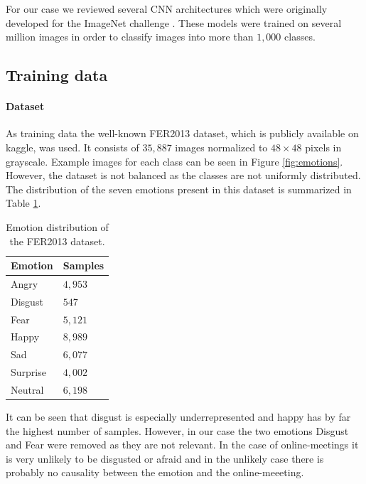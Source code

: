 \documentclass{article}
\begin{document}
For our case we reviewed several CNN architectures which were originally developed for the ImageNet challenge \cite{russakovsky2015imagenet}. These models were trained on several million images in order to classify images into more than $1,000$ classes.

\subsection{Training data}
\paragraph{Dataset} As training data the well-known FER2013 dataset, which is publicly available on kaggle, was used.  It consists of $35,887$ images normalized to $48 \times 48$ pixels in grayscale. Example images for each class can be seen in Figure \ref{fig:emotions}. However, the dataset is not balanced as the classes are not uniformly distributed. The distribution of the seven emotions present in this dataset is summarized in Table \ref{tab:fer}.

\begin{table}
  \centering
\begin{tabular}{ |p{2cm}||p{2cm}| }
 \hline
 Emotion & Samples\\
 \hline
 Angry & $4,953$\\
 \hline
 Disgust & $547$\\
 \hline
 Fear & $5,121$\\
 \hline
 Happy & $8,989$\\
 \hline
 Sad & $6,077$\\
 \hline
 Surprise & $4,002$\\
 \hline
 Neutral & $6,198$\\
 \hline
\end{tabular}
\caption{Emotion distribution of the FER2013 dataset.}
\label{tab:fer}
\end{table}

It can be seen that disgust is especially underrepresented and happy has by far the highest number of samples. However, in our case the two emotions Disgust and Fear were removed as they are not relevant. In the case of online-meetings it is very unlikely to be disgusted or afraid and in the unlikely case there is probably no causality between the emotion and the online-meeeting.
\end{document}
